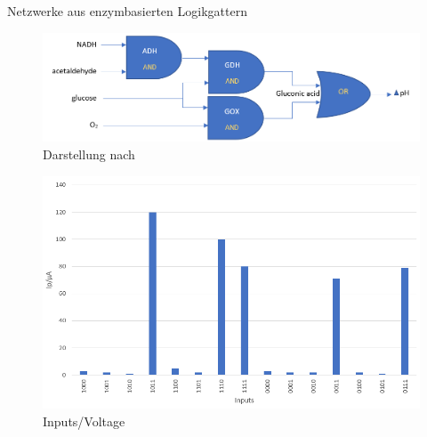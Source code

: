 \documentclass{beamer}
\begin{document}
	\begin{frame}{Netzwerke aus enzymbasierten Logikgattern}
	
	\begin{figure}
		\centering \scriptsize 
		\includegraphics[scale = 0.30]{pics/network2.png} \caption{Darstellung nach \cite{hallo4}} 
	\end{figure}

	\begin{figure}[H] \centering \includegraphics[scale= 0.20]{pics/pH.png} \caption{Inputs/Voltage} \label{img:ph} 
	\end{figure}
	\end{frame}
\end{document}

